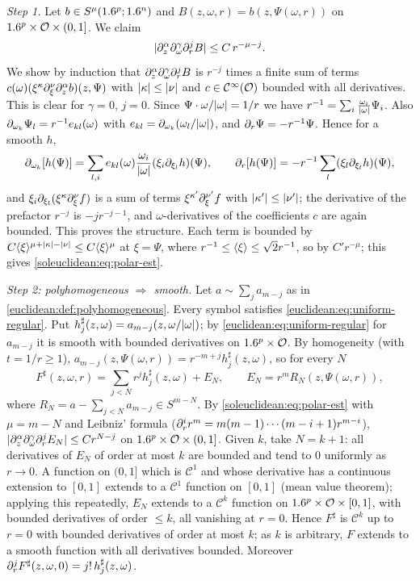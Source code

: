 \emph{Step 1.} Let $b\in S^\mu(1.6^p;1.6^n)$ and $B(z,\omega,r)=b(z,\Psi(\omega,r))$ on
$1.6^p\times\mathcal O\times(0,1]$. We claim
\begin{equation}\label{soleuclidean:eq:polar-est}
  \lvert \partial^\alpha_z\partial^\gamma_\omega\partial^j_rB\rvert\le C\,r^{-\mu-j}.
\end{equation}
We show by induction that $\partial^\alpha_z\partial^\gamma_\omega\partial^j_rB$ is $r^{-j}$ times a finite
sum of terms $c(\omega)(\xi^\kappa\partial^\nu_\xi\partial^\alpha_zb)(z,\Psi)$ with
$\lvert \kappa\rvert\le\lvert \nu\rvert$ and $c\in\mathcal{C}^\infty(\mathcal O)$ bounded with all derivatives. This is
clear for $\gamma=0$, $j=0$. Since $\Psi\cdot\omega/\lvert \omega\rvert=1/r$ we have
$r^{-1}=\sum_i\frac{\omega_i}{\lvert \omega\rvert}\Psi_i$. Also
$\partial_{\omega_k}\Psi_l=r^{-1}e_{kl}(\omega)$ with $e_{kl}=\partial_{\omega_k}(\omega_l/\lvert \omega\rvert)$, and
$\partial_r\Psi=-r^{-1}\Psi$. Hence for a smooth $h$,
\begin{equation*}
  \partial_{\omega_k}[h(\Psi)]=\sum_{l,i}e_{kl}(\omega)\frac{\omega_i}{\lvert \omega\rvert}
  (\xi_i\partial_{\xi_l}h)(\Psi),\qquad
  \partial_r[h(\Psi)]=-r^{-1}\sum_l(\xi_l\partial_{\xi_l}h)(\Psi),
\end{equation*}
and $\xi_i\partial_{\xi_l}(\xi^\kappa\partial^\nu_\xi f)$ is a sum of terms $\xi^{\kappa'}\partial^{\nu'}_\xi f$
with $\lvert \kappa'\rvert\le\lvert \nu'\rvert$; the derivative of the prefactor $r^{-j}$ is
$-jr^{-j-1}$, and $\omega$-derivatives of the coefficients $c$ are again bounded. This
proves the structure. Each term is bounded by
$C\langle \xi\rangle^{\mu+\lvert \kappa\rvert-\lvert \nu\rvert}\le C\langle \xi\rangle^\mu$ at $\xi=\Psi$, where
$r^{-1}\le\langle \xi\rangle\le\sqrt2r^{-1}$, so by $C'r^{-\mu}$; this gives
\eqref{soleuclidean:eq:polar-est}.

\emph{Step 2: polyhomogeneous $\Rightarrow$ smooth.} Let $a\sim\sum_ja_{m-j}$ as in
\cref{euclidean:def:polyhomogeneous}. Every symbol satisfies
\eqref{euclidean:eq:uniform-regular}. Put $h_j^\sharp(z,\omega)=a_{m-j}(z,\omega/\lvert \omega\rvert)$;
by \eqref{euclidean:eq:uniform-regular} for $a_{m-j}$ it is smooth with bounded
derivatives on $1.6^p\times\mathcal O$. By homogeneity (with $t=1/r\ge1$),
$a_{m-j}(z,\Psi(\omega,r))=r^{-m+j}h_j^\sharp(z,\omega)$, so for every $N$
\begin{equation*}
  F^\sharp(z,\omega,r)=\sum_{j<N}r^jh_j^\sharp(z,\omega)+E_N,\qquad
  E_N=r^mR_N(z,\Psi(\omega,r)),
\end{equation*}
where $R_N=a-\sum_{j<N}a_{m-j}\in S^{m-N}$.
By \eqref{soleuclidean:eq:polar-est} with $\mu=m-N$ and Leibniz' formula
($\partial_r^ir^m=m(m-1)\cdots(m-i+1)r^{m-i}$),
$\lvert \partial^\alpha_z\partial^\gamma_\omega\partial^j_rE_N\rvert\le Cr^{N-j}$ on $1.6^p\times\mathcal O\times(0,1]$.
Given $k$, take $N=k+1$: all derivatives of $E_N$ of order at most $k$ are bounded and
tend to $0$ uniformly as $r\to0$. A function on $(0,1]$ which is $\mathcal C^1$ and whose
derivative has a continuous extension to $[0,1]$ extends to a $\mathcal C^1$ function on
$[0,1]$ (mean value theorem); applying this repeatedly, $E_N$ extends to a
$\mathcal C^k$ function on $1.6^p\times\mathcal O\times[0,1]$, with bounded derivatives of
order $\le k$, all vanishing at $r=0$. Hence $F^\sharp$ is $\mathcal C^k$ up to $r=0$ with
bounded derivatives of order at most $k$; as $k$ is arbitrary, $F$ extends to a smooth
function with all derivatives bounded. Moreover $\partial^j_rF^\sharp(z,\omega,0)=j!\,h_j^\sharp(z,\omega)$.

